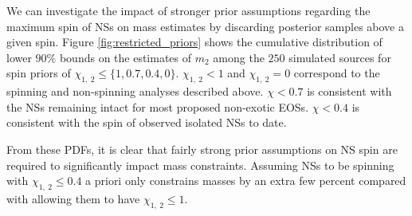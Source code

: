 We can investigate the impact of stronger prior assumptions regarding the maximum spin of NSs on mass estimates by discarding posterior samples above a given spin.  Figure \ref{fig:restricted_priors} shows the cumulative distribution of lower $90\%$ bounds on the estimates of $m_2$ among the $250$ simulated sources for spin priors of $\chi_{1,~2} \leq \{1, 0.7, 0.4, 0\}$.  $\chi_{1,~2}<1$ and $\chi_{1,~2}=0$ correspond to the spinning and non-spinning analyses described above.  $\chi<0.7$ is consistent with the NSs remaining intact for most proposed non-exotic EOSs.  $\chi<0.4$ is consistent with the spin of observed isolated NSs to date.

From these PDFs, it is clear that fairly strong prior assumptions on NS spin are required to significantly impact mass constraints. Assuming NSs to be spinning with $\chi_{1,~2}\leq 0.4$ a priori only constrains masses by an extra few percent compared with allowing them to have $\chi_{1,~2} \leq 1$.